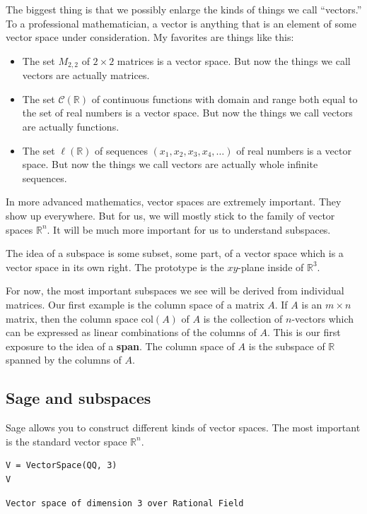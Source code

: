 \documentclass[10pt,]{book}
\newcommand{\terminology}[1]{\textbf{#1}}
\theoremstyle{plain}
\theoremstyle{definition}
\numberwithin{equation}{section}
\begin{document}
      The biggest thing is that we possibly enlarge the kinds of things we
      call ``vectors.'' To a professional mathematician, a vector is
      anything that is an element of some vector space under consideration.
      My favorites are things like this:
\begin{itemize}
\item{}
        The set \(M_{2,2}\) of \(2\times 2\) matrices is a vector space.
        But now the things we call vectors are actually matrices.
      \item{}
        The set \(\mathcal{C}(\mathbb{R})\) of continuous functions with
        domain and range both equal to the set of real numbers is a vector
        space. But now the things we call vectors are actually functions.
      \item{}
        The set \(\ell(\mathbb{R})\) of sequences
        \((x_1, x_2, x_3, x_4, \ldots)\) of real numbers is a vector space.
        But now the things we call vectors are actually whole infinite sequences.
      \end{itemize}
\par

      In more advanced mathematics, vector spaces are extremely important. They
      show up everywhere. But for us, we will mostly stick to the family of vector
      spaces \(\mathbb{R}^n\). It will be much more important for us to understand
      subspaces.
\par

      The idea of a subspace is some subset, some part, of a vector space which
      is a vector space in its own right. The prototype is the \(xy\)-plane
      inside of \(\mathbb{R}^3\).
\par

      For now, the most important subspaces we see will be derived from
      individual matrices. Our first example is the column space of a matrix
      \(A\). If \(A\) is an \(m\times n\) matrix, then the column
      space \(\mathrm{col}(A)\) of \(A\) is the collection of
      \(n\)-vectors which can be expressed as linear combinations of the
      columns of \(A\). This is our first exposure to the idea of a
      \terminology{span}. The column space of \(A\) is the subspace of
      \(\mathbb{R}\) spanned by the columns of \(A\).
\typeout{************************************************}
\typeout{************************************************}
\subsection[Sage and subspaces]{Sage and subspaces}\label{subsection-61}
Sage allows you to construct different kinds of vector spaces. The most
      important is the standard vector space \(\mathbb{R}^n\).
\begin{lstlisting}[style=sageinput]
V = VectorSpace(QQ, 3)
V
\end{lstlisting}
\begin{lstlisting}[style=sageoutput]
Vector space of dimension 3 over Rational Field
\end{lstlisting}
\par
\end{document}
